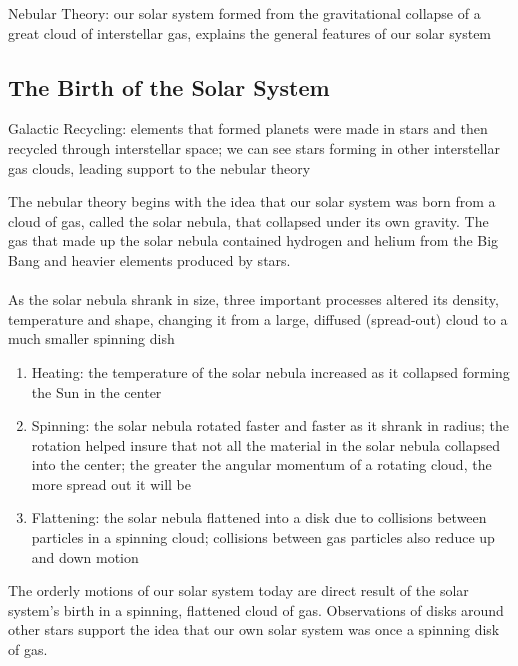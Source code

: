 \documentclass[12pt]{article}
\begin{document}
\begin{definition} Nebular Theory: our solar system formed from the gravitational collapse of a great cloud of interstellar gas, explains the general features of our solar system \end{definition}

\subsection{The Birth of the Solar System} 
\begin{definition} Galactic Recycling: elements that formed planets were made in stars and then recycled through interstellar space; we can see stars forming in other interstellar gas clouds, leading support to the nebular theory \end{definition}
The nebular theory begins with the idea that our solar system was born from a cloud of gas, called the solar nebula, that collapsed under its own gravity. The gas that made up the solar nebula contained hydrogen and helium from the Big Bang and heavier elements produced by stars. \\~\\
As the solar nebula shrank in size, three important processes altered its density, temperature and shape, changing it from a large, diffused (spread-out) cloud to a much smaller spinning dish \begin{enumerate} 
\item Heating: the temperature of the solar nebula increased as it collapsed forming the Sun in the center 
\item Spinning: the solar nebula rotated faster and faster as it shrank in radius; the rotation helped insure that not all the material in the solar nebula collapsed into the center; the greater the angular momentum of a rotating cloud, the more spread out it will be 
\item Flattening: the solar nebula flattened into a disk due to collisions between particles in a spinning cloud; collisions between gas particles also reduce up and down motion \end{enumerate} 
The orderly motions of our solar system today are direct result of the solar system's birth in a spinning, flattened cloud of gas. Observations of disks around other stars support the idea that our own solar system was once a spinning disk of gas. \\~\\
\end{document}
